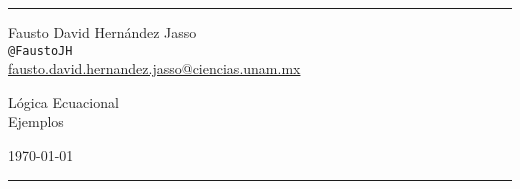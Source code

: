 \documentclass[a4paper]{article}
\begin{document}

\fancyhead[C]{}
\hrule \medskip %
\begin{minipage}{0.35\textwidth} 
\raggedright
\footnotesize
Fausto David Hernández Jasso \hfill\\   
\texttt{@FaustoJH} \hfill\\
\href{mailto:fausto.david.hernandez.jasso@ciencias.unam.mx}{fausto.david.hernandez.jasso@ciencias.unam.mx}
\end{minipage}
\begin{minipage}{0.4\textwidth} 
\centering 
\large 
Lógica Ecuacional\\ 
\normalsize 
Ejemplos\\ 
\end{minipage}
\begin{minipage}{0.24\textwidth} 
\raggedleft
\today\hfill\\
\end{minipage}
\medskip\hrule
\bigskip
\end{document}

